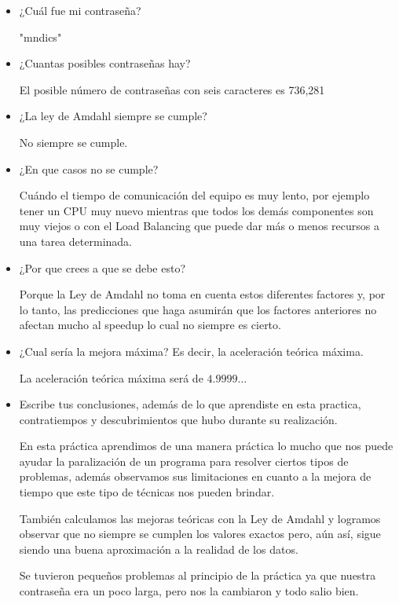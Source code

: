 \documentclass[10pt,letterpaper]{article}
\begin{document}
    \begin{itemize}
        \item ¿Cuál fue mi contraseña?

        "mndics"

        \item ¿Cuantas posibles contraseñas hay?

        El posible número de contraseñas con seis caracteres es 736,281

        \item ¿La ley de Amdahl siempre se cumple?

        No siempre se cumple.

        \item ¿En que casos no se cumple?

        Cuándo el tiempo de comunicación del equipo es muy lento, por ejemplo tener un CPU muy nuevo mientras que todos los demás componentes son muy viejos o con el Load Balancing que puede dar más o menos recursos a una tarea determinada.

        \item ¿Por que crees a que se debe esto? 

        Porque la Ley de Amdahl no toma en cuenta estos diferentes factores y, por lo tanto, las predicciones que haga asumirán que los factores anteriores no afectan mucho al speedup lo cual no siempre es cierto.

        \item ¿Cual sería la mejora máxima? Es decir, la aceleración teórica máxima.

        La aceleración teórica máxima será de $4.9999\dots$

        \item Escribe tus conclusiones, además de lo que aprendiste en esta practica, contratiempos y descubrimientos que hubo durante su realización. 

        En esta práctica aprendimos de una manera práctica lo mucho que nos puede ayudar la paralización de un programa para resolver ciertos tipos de problemas, además observamos sus limitaciones en cuanto a la mejora de tiempo que este tipo de técnicas nos pueden brindar.

        También calculamos las mejoras teóricas con la Ley de Amdahl y logramos observar que no siempre se cumplen los valores exactos pero, aún así, sigue siendo una buena aproximación a la realidad de los datos.

        Se tuvieron pequeños problemas al principio de la práctica ya que nuestra contraseña era un poco larga, pero nos la cambiaron y todo salio bien.


\end{itemize}
\end{document}
